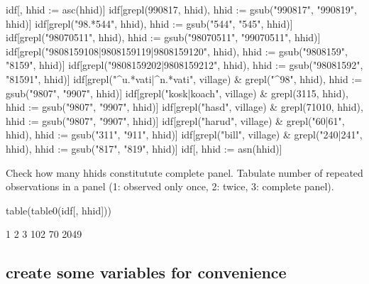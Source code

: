 \begin{Schunk}
\begin{Sinput}
idf[, hhid := asc(hhid)]
idf[grepl(990817, hhid), hhid := gsub("990817", "990819", hhid)]
idf[grepl("98.*544", hhid), hhid := gsub("544", "545", hhid)]
idf[grepl("98070511", hhid), hhid := gsub("98070511", "99070511", hhid)]
idf[grepl("9808159108|9808159119|9808159120", hhid), 
	hhid := gsub("9808159", "8159", hhid)]
idf[grepl("9808159202|9808159212", hhid), 
	hhid := gsub("98081592", "81591", hhid)]
idf[grepl("^u.*vati|^n.*vati", village) & grepl("^98", hhid), 
	hhid := gsub("9807", "9907", hhid)]
idf[grepl("kosk|koach", village) & grepl(3115, hhid), 
	hhid := gsub("9807", "9907", hhid)]
idf[grepl("hasd", village) & grepl(71010, hhid), 
	hhid := gsub("9807", "9907", hhid)]
idf[grepl("harud", village) & grepl("60|61", hhid), 
	hhid := gsub("311", "911", hhid)]
idf[grepl("bill", village) & grepl("240|241", hhid), 
	hhid := gsub("817", "819", hhid)]
idf[, hhid := asn(hhid)]
\end{Sinput}
\end{Schunk}


Check how many hhids constitutute complete panel. Tabulate number of repeated observations in a panel (1: observed only once, 2: twice, 3: complete panel).
\begin{Schunk}
\begin{Sinput}
table(table0(idf[, hhid]))
\end{Sinput}
\begin{Soutput}

   1    2    3 
 102   70 2049 
\end{Soutput}
\end{Schunk}

\subsection{create some variables for convenience}


